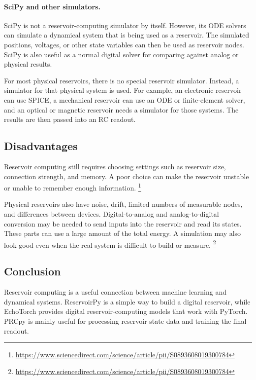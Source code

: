 \documentclass{article}
\begin{document}
\paragraph{SciPy and other simulators.}
SciPy is not a reservoir-computing simulator by itself. However, its ODE solvers can simulate a dynamical system that is being used as a reservoir. The simulated positions, voltages, or other state variables can then be used as reservoir nodes. SciPy is also useful as a normal digital solver for comparing against analog or physical results.

For most physical reservoirs, there is no special reservoir simulator. Instead, a simulator for that physical system is used. For example, an electronic reservoir can use SPICE, a mechanical reservoir can use an ODE or finite-element solver, and an optical or magnetic reservoir needs a simulator for those systems. The results are then passed into an RC readout.

\subsection{Disadvantages}

Reservoir computing still requires choosing settings such as reservoir size, connection strength, and memory. A poor choice can make the reservoir unstable or unable to remember enough information.
\footnote{\url{https://www.sciencedirect.com/science/article/pii/S0893608019300784}}

Physical reservoirs also have noise, drift, limited numbers of measurable nodes, and differences between devices. Digital-to-analog and analog-to-digital conversion may be needed to send inputs into the reservoir and read its states. These parts can use a large amount of the total energy. A simulation may also look good even when the real system is difficult to build or measure.
\footnote{\url{https://www.sciencedirect.com/science/article/pii/S0893608019300784}}

\subsection{Conclusion}

Reservoir computing is a useful connection between machine learning and dynamical systems. ReservoirPy is a simple way to build a digital reservoir, while EchoTorch provides digital reservoir-computing models that work with PyTorch. PRCpy is mainly useful for processing reservoir-state data and training the final readout.
\end{document}
